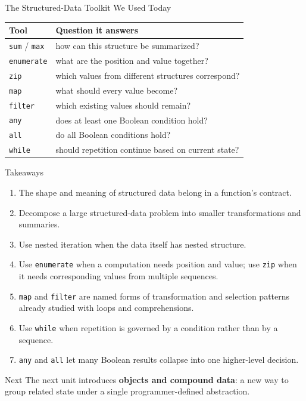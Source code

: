 \documentclass[aspectratio=169,10pt]{beamer}
\begin{document}
\begin{frame}{The Structured-Data Toolkit We Used Today}
  \begin{center}
    \renewcommand{\arraystretch}{1.25}
    \begin{tabular}{l|l}
      \textbf{Tool} & \textbf{Question it answers} \\\hline
      \texttt{sum} / \texttt{max} & how can this structure be summarized? \\
      \texttt{enumerate} & what are the position and value together? \\
      \texttt{zip} & which values from different structures correspond? \\
      \texttt{map} & what should every value become? \\
      \texttt{filter} & which existing values should remain? \\
      \texttt{any} & does at least one Boolean condition hold? \\
      \texttt{all} & do all Boolean conditions hold? \\
      \texttt{while} & should repetition continue based on current state?
    \end{tabular}
  \end{center}
\end{frame}

\begin{frame}{Takeaways}
  \begin{enumerate}
    \item The shape and meaning of structured data belong in a function's contract.
    \item Decompose a large structured-data problem into smaller transformations and summaries.
    \item Use nested iteration when the data itself has nested structure.
    \item Use \texttt{enumerate} when a computation needs position and value; use \texttt{zip} when it needs corresponding values from multiple sequences.
    \item \texttt{map} and \texttt{filter} are named forms of transformation and selection patterns already studied with loops and comprehensions.
    \item Use \texttt{while} when repetition is governed by a condition rather than by a sequence.
    \item \texttt{any} and \texttt{all} let many Boolean results collapse into one higher-level decision.
  \end{enumerate}

  \begin{block}{Next}
    The next unit introduces \textbf{objects and compound data}: a new way to group related state under a single programmer-defined abstraction.
  \end{block}
\end{frame}
\end{document}
